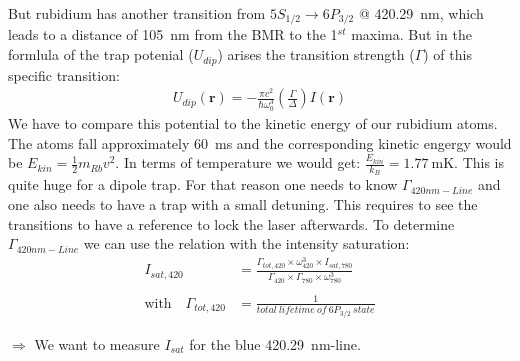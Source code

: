 But rubidium has another transition from \(5S_{1/2} \rightarrow 6P_{3/2}\) @
\SI{420.29}{\nano\meter}, which leads to a distance of \SI{105}{\nano\meter} from
the BMR to the 1\(^{st}\) maxima. But in the formlula \citep{grimm} of the trap potenial (\(U_{dip}\))
arises the transition strength (\(\Gamma \)) of this specific transition:
\bigskip
\begin{align*}
    U_{dip}(\mathbf{r})=-\frac{\pi c^2}{\hbar\omega_0^3} \left( \frac{\Gamma}{\Delta} \right) I(\mathbf{r})
\end{align*}
\bigskip
We have to compare this potential to the kinetic energy of our rubidium atoms. The atoms fall approximately
\SI{60}{\milli\second} and the corresponding kinetic engergy would be \(E_{kin} = \frac{1}{2} m_{Rb} v^2\).
In terms of temperature we would get: \(\frac{E_{kin}}{k_B} = \SI{1.77}{\milli\kelvin}\). This is quite huge
for a dipole trap. For that reason one needs to know \(\Gamma_{420nm-Line}\) and one also needs to have a trap
with a small detuning. This requires to see the transitions to have a reference to lock the laser afterwards.
\bigskip
To determine \(\Gamma_{420nm-Line}\) we can use the relation with the intensity saturation:
\begin{align*}
    I_{sat,420} &= \frac{\Gamma_{tot,420}\times\omega_{420}^3\times I_{sat,780}}{\Gamma_{420}\times\Gamma_{780}\times\omega_{780}^3} \\ \\
    \text{with~~~} \Gamma_{tot,420} &= \frac{1}{total~lifetime~of~6P_{3/2}~state}
\end{align*}

\(\Rightarrow \) We want to measure \(I_{sat}\) for the blue \SI{420.29}{\nano\meter}-line. 

